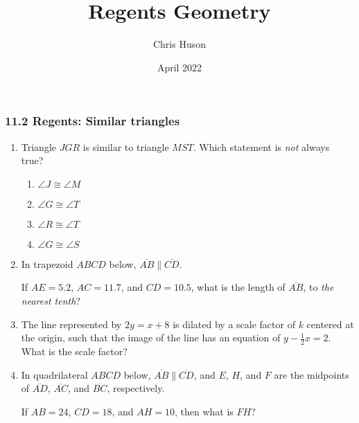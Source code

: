 \documentclass[12pt, oneside]{article}
\title{Regents Geometry}
\author{Chris Huson}
\date{April 2022}
\begin{document}
\subsubsection*{11.2 Regents: Similar triangles}
\begin{enumerate}[itemsep=1.7cm]
\item Triangle $JGR$ is similar to triangle $MST$. Which statement is \emph{not}
always true?
\begin{multicols}{2}
  \begin{enumerate}
    \item $\angle J \cong \angle M$
    \item $\angle G \cong \angle T$ 
    \item $\angle R \cong \angle T$
    \item $\angle G \cong \angle S$
  \end{enumerate}
\end{multicols}

\item In trapezoid $ABCD$ below, $\overline{AB} \parallel \overline{CD}$.
\begin{center}
  \end{center}
If $AE=5.2$, $AC=11.7$, and $CD=10.5$, what is the length of $\overline{AB}$, to \emph{the nearest tenth}?

\item The line represented by $2y=x+8$ is dilated by a scale factor
of $k$ centered at the origin, such that the image of the line has an
equation of $y - \frac{1}{2} x=2$. What is the scale factor?

\item In quadrilateral $ABCD$ below, $\overline{AB} \parallel \overline{CD}$, and $E$, $H$, and $F$ are the midpoints of $\overline{AD}$, $\overline{AC}$,  and $\overline{BC}$, respectively.
\begin{center}
  \end{center}
If $AB=24$, $CD=18$, and $AH=10$, then what is $FH$?


\end{enumerate}
\end{document}
